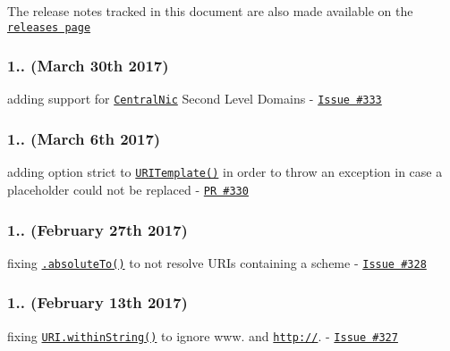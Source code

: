The release notes tracked in this document are also made available on the \href{https://github.com/medialize/URI.js/releases}{\tt releases page}

\subsubsection*{1.. (March 30th 2017)}


\begin{DoxyItemize}
\item adding support for \href{https://en.wikipedia.org/wiki/CentralNic#Second-level_domains}{\tt Central\+Nic} Second Level Domains -\/ \href{https://github.com/medialize/URI.js/issues/333}{\tt Issue \#333}
\end{DoxyItemize}

\subsubsection*{1.. (March 6th 2017)}


\begin{DoxyItemize}
\item adding option {\ttfamily strict} to \href{http://medialize.github.io/URI.js/uri-template.html}{\tt {\ttfamily U\+R\+I\+Template()}} in order to throw an exception in case a placeholder could not be replaced -\/ \href{https://github.com/medialize/URI.js/issues/330}{\tt PR \#330}
\end{DoxyItemize}

\subsubsection*{1.. (February 27th 2017)}


\begin{DoxyItemize}
\item fixing \href{http://medialize.github.io/URI.js/docs.html#absoluteto}{\tt {\ttfamily .absolute\+To()}} to not resolve U\+R\+Is containing a scheme -\/ \href{https://github.com/medialize/URI.js/issues/328}{\tt Issue \#328}
\end{DoxyItemize}

\subsubsection*{1.. (February 13th 2017)}


\begin{DoxyItemize}
\item fixing \href{http://medialize.github.io/URI.js/docs.html#static-withinString}{\tt {\ttfamily U\+R\+I.\+within\+String()}} to ignore {\ttfamily www.} and {\ttfamily \href{http://}{\tt http\+://}.} -\/ \href{https://github.com/medialize/URI.js/issues/327}{\tt Issue \#327}
\end{DoxyItemize}

